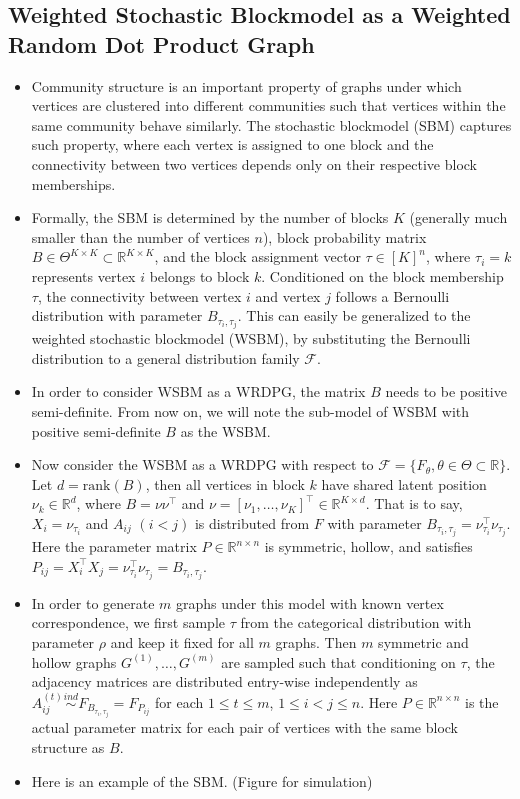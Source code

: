 \documentclass[a4paper]{article}
\begin{document}
\subsection{Weighted Stochastic Blockmodel as a Weighted Random Dot Product Graph}
\label{section:WSBM}
\begin{itemize}
\item Community structure is an important property of graphs under which vertices are clustered into different communities such that vertices within the same community behave similarly. The stochastic blockmodel (SBM) \cite{holland1983stochastic} captures such property, where each vertex is assigned to one block and the connectivity between two vertices depends only on their respective block memberships.
\item Formally, the SBM is determined by the number of blocks $K$ (generally much smaller than the number of vertices $n$), block probability matrix $B \in \Theta^{K \times K} \subset \mathbb{R}^{K \times K}$, and the block assignment vector $\tau \in [K]^n$, where $\tau_i = k$ represents vertex $i$ belongs to block $k$. Conditioned on the block membership $\tau$, the connectivity between vertex $i$ and vertex $j$ follows a Bernoulli distribution with parameter $B_{\tau_i, \tau_j}$. This can easily be generalized to the weighted stochastic blockmodel (WSBM), by substituting the Bernoulli distribution to a general distribution family $\mathcal{F}$.
\item In order to consider WSBM as a WRDPG, the matrix $B$ needs to be positive semi-definite. From now on, we will note the sub-model of WSBM with positive semi-definite $B$ as the WSBM.
\item Now consider the WSBM as a WRDPG with respect to $\mathcal{F} = \{ F_{\theta}, \theta \in \Theta \subset \mathbb{R} \}$. Let $d = 
\mathrm{rank}(B)$, then all vertices in block $k$ have shared latent position $\nu_k \in \mathbb{R}^{d}$, where $B = \nu \nu^{\top}$ and $\nu = [\nu_1, \dotsc, \nu_K]^{\top} \in \mathbb{R}^{K \times d}$. That is to say, $X_i = \nu_{\tau_i}$ and $A_{ij}$ $(i < j)$ is distributed from $F$ with parameter $B_{\tau_i, \tau_j} = \nu_{\tau_i}^{\top} \nu_{\tau_j}$. Here the parameter matrix $P \in \mathbb{R}^{n \times n}$ is symmetric, hollow, and satisfies $P_{ij} = X_i^{\top} X_j = \nu_{\tau_i}^{\top} \nu_{\tau_j} = B_{\tau_i, \tau_j}$.
\item In order to generate $m$ graphs under this model with known vertex correspondence, we first sample $\tau$ from the categorical distribution with parameter $\rho$ and keep it fixed for all $m$ graphs. Then $m$ symmetric and hollow graphs $G^{(1)}, \dotsc, G^{(m)}$ are sampled such that conditioning on $\tau$, the adjacency matrices are distributed entry-wise independently as $A^{(t)}_{ij} \stackrel{ind}{\sim} F_{B_{\tau_i, \tau_j}} = F_{P_{ij}}$ for each $1 \le t \le m$, $1 \le i < j \le n$. Here $P \in \mathbb{R}^{n \times n}$ is the actual parameter matrix for each pair of vertices with the same block structure as $B$.
\item Here is an example of the SBM. (Figure for simulation)
\end{itemize}
\end{document}
